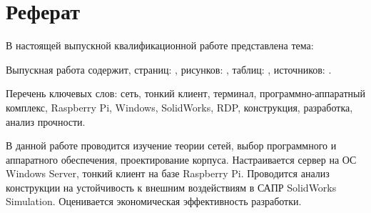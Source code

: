 \chapter*{Реферат}

В настоящей выпускной квалификационной работе представлена тема:

Выпускная работа содержит, страниц: \pageref{LastPage}, рисунков: \totalfigures,
таблиц: \totaltables, источников: .

Перечень ключевых слов: сеть, тонкий клиент, терминал, программно-аппаратный комплекс,
Raspberry Pi, Windows, SolidWorks, RDP, конструкция, разработка, анализ прочности.

В данной работе проводится изучение теории сетей, выбор программного и аппаратного
обеспечения, проектирование корпуса. Настраивается сервер на ОС Windows Server, тонкий
клиент на базе Raspberry Pi. Проводится анализ конструкции на устойчивость к внешним
воздействиям в САПР
SolidWorks Simulation. Оценивается экономическая эффективность разработки.

